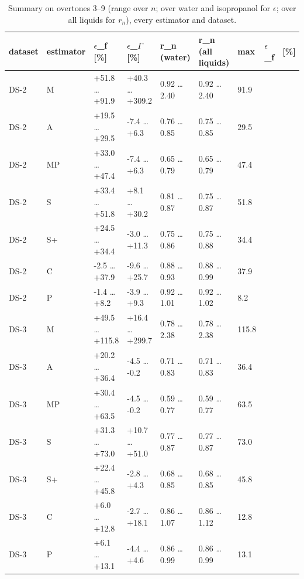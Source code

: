 \documentclass[11pt,a4paper]{article}
\begin{document}
\begin{landscape}{\scriptsize\setlength{\tabcolsep}{2pt}
\begin{longtable}{@{}lllllllll@{}}
\caption{Summary on overtones 3--9 (range over $n$; over water and isopropanol for $\epsilon$; over all liquids for $r_n$), every estimator and dataset.}\\
\toprule
dataset & estimator & $\epsilon$\_f [\%] & $\epsilon$\_$\Gamma$ [\%] & r\_n (water) & r\_n (all liquids) & max & $\epsilon$\_f & [\%] \\\midrule\endhead
DS-2 & M & +51.8 \ldots{} +91.9 & +40.3 \ldots{} +309.2 & 0.92 \ldots{} 2.40 & 0.92 \ldots{} 2.40 & 91.9 &  &  \\
DS-2 & A & +19.5 \ldots{} +29.5 & -7.4 \ldots{} +6.3 & 0.76 \ldots{} 0.85 & 0.75 \ldots{} 0.85 & 29.5 &  &  \\
DS-2 & MP & +33.0 \ldots{} +47.4 & -7.4 \ldots{} +6.3 & 0.65 \ldots{} 0.79 & 0.65 \ldots{} 0.79 & 47.4 &  &  \\
DS-2 & S & +33.4 \ldots{} +51.8 & +8.1 \ldots{} +30.2 & 0.81 \ldots{} 0.87 & 0.75 \ldots{} 0.87 & 51.8 &  &  \\
DS-2 & S+ & +24.5 \ldots{} +34.4 & -3.0 \ldots{} +11.3 & 0.75 \ldots{} 0.86 & 0.75 \ldots{} 0.88 & 34.4 &  &  \\
DS-2 & C & -2.5 \ldots{} +37.9 & -9.6 \ldots{} +25.7 & 0.88 \ldots{} 0.93 & 0.88 \ldots{} 0.99 & 37.9 &  &  \\
DS-2 & P & -1.4 \ldots{} +8.2 & -3.9 \ldots{} +9.3 & 0.92 \ldots{} 1.01 & 0.92 \ldots{} 1.02 & 8.2 &  &  \\
DS-3 & M & +49.5 \ldots{} +115.8 & +16.4 \ldots{} +299.7 & 0.78 \ldots{} 2.38 & 0.78 \ldots{} 2.38 & 115.8 &  &  \\
DS-3 & A & +20.2 \ldots{} +36.4 & -4.5 \ldots{} -0.2 & 0.71 \ldots{} 0.83 & 0.71 \ldots{} 0.83 & 36.4 &  &  \\
DS-3 & MP & +30.4 \ldots{} +63.5 & -4.5 \ldots{} -0.2 & 0.59 \ldots{} 0.77 & 0.59 \ldots{} 0.77 & 63.5 &  &  \\
DS-3 & S & +31.3 \ldots{} +73.0 & +10.7 \ldots{} +51.0 & 0.77 \ldots{} 0.87 & 0.77 \ldots{} 0.87 & 73.0 &  &  \\
DS-3 & S+ & +22.4 \ldots{} +45.8 & -2.8 \ldots{} +4.3 & 0.68 \ldots{} 0.85 & 0.68 \ldots{} 0.85 & 45.8 &  &  \\
DS-3 & C & +6.0 \ldots{} +12.8 & -2.7 \ldots{} +18.1 & 0.86 \ldots{} 1.07 & 0.86 \ldots{} 1.12 & 12.8 &  &  \\
DS-3 & P & +6.1 \ldots{} +13.1 & -4.4 \ldots{} +4.6 & 0.86 \ldots{} 0.99 & 0.86 \ldots{} 0.99 & 13.1 &  &  \\
\bottomrule
\end{longtable}}\end{landscape}
\end{document}
